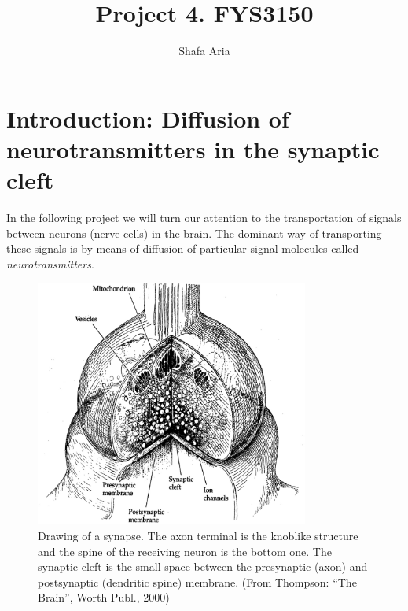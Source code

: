 \documentclass{article}
\begin{document}
\title{Project 4. FYS3150}
\author{Shafa Aria}
\maketitle
\newpage
\section{Introduction: Diffusion of neurotransmitters in the synaptic cleft}

In the following project we will turn our attention to the transportation of signals between neurons (nerve cells) in the brain. 
The dominant way of transporting these signals is by means of diffusion of particular signal molecules called \textit{neurotransmitters}.
\begin{figure}[thb]
\centerline{\includegraphics[width=9cm]{thompsonB2000-p38.eps}}
\caption{\small Drawing of a synapse. The axon terminal is the knoblike
structure and the spine of the receiving neuron is the bottom one. The
synaptic cleft is the small space between the presynaptic (axon)
and postsynaptic (dendritic spine) membrane.
(From Thompson: ``The Brain'', Worth Publ., 2000)}
\label{fig:figure1}
\end{figure}
\end{document}
